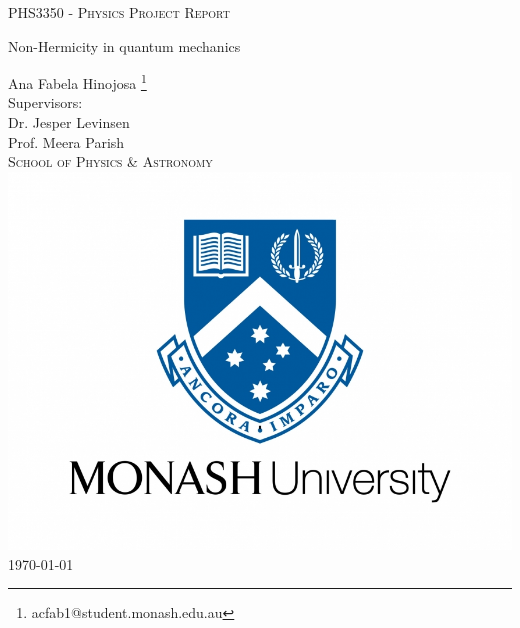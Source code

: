 \documentclass[10pt, a4paper, singlespacing, headsepline]{article}
\begin{document}
\begin{titlepage}
\begin{center}


\vspace{0.5cm}
\textsc{PHS3350 - Physics Project Report} \\
\vspace{2.5cm}

{\Huge Non-Hermicity in quantum mechanics}
\vspace{3cm}

{\LARGE Ana Fabela Hinojosa \footnote{acfab1@student.monash.edu.au}} \\
\vspace{0.4cm}
{\Large Supervisors:\\ Dr. Jesper Levinsen \\ Prof. Meera Parish \\}
\textsc{School of Physics \& Astronomy} \\
\vspace{3cm}
\includegraphics[scale=0.2]{logo.jpg} \\ %
\vspace{3cm}
{\LARGE \today}\\
\vspace{0.5cm}
\end{center}
\end{titlepage}

\end{document}
